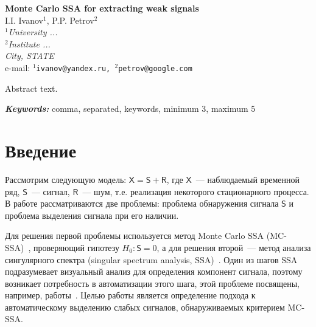 \documentclass[12pt]{article}
\providecommand{\keywords}[1]
{
\vspace{2mm}\hspace{20pt}\textbf{\textit{Keywords:}} #1
}
\providecommand{\abskeyw}[2]
{
\begin{small}
\begin{adjustwidth}{10mm}{10mm}
\vspace{1mm}\hspace{20pt}#1

\keywords{#2}
\end{adjustwidth}
\end{small}
}
\begin{document}
\begin{center}
{\Large\bf Monte Carlo SSA for extracting weak signals}\\\vspace{2mm} {\sc I.I.
Ivanov$^1$, P.P. Petrov$^2$}\\\vspace{2mm}
{\it $^{1}$University ...\\
$^{2}$Institute  ...\\
City, STATE\\} e-mail: {\tt $^1$ivanov@yandex.ru,
$^2$petrov@google.com}

\abskeyw{Abstract text.}{comma, separated, keywords, minimum 3,
maximum 5}
\end{center}

\section{Введение}

Рассмотрим следующую модель: $\mathsf{X}=\mathsf{S}+\mathsf{R}$, где $\mathsf{X}$~--- наблюдаемый временной ряд, $\mathsf{S}$~--- сигнал, $\mathsf{R}$~--- шум, т.е. реализация некоторого стационарного процесса. В работе рассматриваются две проблемы: проблема обнаружения сигнала $\mathsf{S}$ и проблема выделения сигнала при его наличии.

Для решения первой проблемы используется метод Monte Carlo SSA (MC-SSA)~\cite{AllenSmith96}, проверяющий гипотезу $H_0:\mathsf{S}=0$, а для решения второй~--- метод анализа сингулярного спектра (singular spectrum analysis, SSA)~\cite{Broomhead1986, ssa2001}. Один из шагов SSA подразумевает визуальный анализ для определения компонент сигнала, поэтому возникает потребность в автоматизации этого шага, этой проблеме посвящены, например, работы~\cite{alexandrov, Kalantari2019, circSSA, autoSSA}. Целью работы является определение подхода к автоматическому выделению слабых сигналов, обнаруживаемых критерием MC-SSA.


\end{document}
